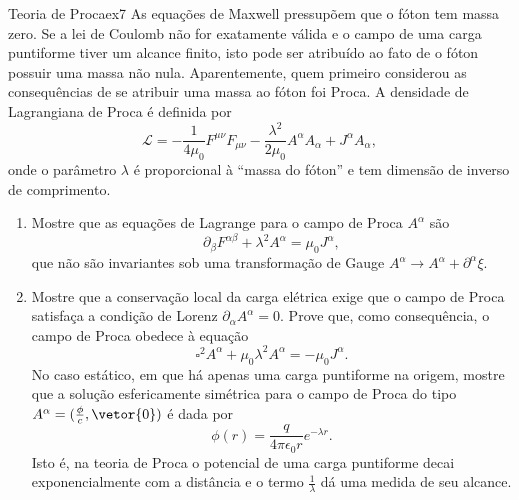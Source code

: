 \begin{exercício}{Teoria de Proca}{ex7}
   As equações de Maxwell pressupõem que o fóton tem massa zero. Se a lei de Coulomb não for exatamente válida e o campo de uma carga puntiforme tiver um alcance finito, isto pode ser atribuído ao fato de o fóton possuir uma massa não nula. Aparentemente, quem primeiro considerou as consequências de se atribuir uma massa ao fóton foi Proca. A densidade de Lagrangiana de Proca é definida por
   \begin{equation*}
      \mathcal{L} = - \frac{1}{4\mu_0} F^{\mu\nu} F_{\mu\nu} - \frac{\lambda^2}{2\mu_0} A^\alpha A_\alpha + J^\alpha A_\alpha,
   \end{equation*}
   onde o parâmetro \(\lambda\) é proporcional à \enquote{massa do fóton} e tem dimensão de inverso de comprimento.
   \begin{enumerate}[label=(\alph*)]
       \item Mostre que as equações de Lagrange para o campo de Proca \(A^\alpha\) são
          \begin{equation*}
             \partial_\beta F^{\alpha \beta} + \lambda^2 A^\alpha = \mu_0 J^\alpha,
          \end{equation*}
          que não são invariantes sob uma transformação de Gauge \(A^\alpha \to A^\alpha + \partial^\alpha \xi.\)
       \item Mostre que a conservação local da carga elétrica exige que o campo de Proca satisfaça a condição de Lorenz \(\partial_\alpha A^\alpha = 0.\) Prove que, como consequência, o campo de Proca obedece à equação 
          \begin{equation*}
              \square^2 A^\alpha + \mu_0 \lambda^2 A^\alpha = - \mu_0 J^\alpha.
          \end{equation*}
          No caso estático, em que há apenas uma carga puntiforme na origem, mostre que a solução esfericamente simétrica para o campo de Proca do tipo \(A^\alpha = (\frac{\phi}{c}, \vetor{0})\) é dada por
          \begin{equation*}
             \phi(r) = \frac{q}{4\pi \epsilon_0 r} e^{-\lambda r}.
          \end{equation*}
          Isto é, na teoria de Proca o potencial de uma carga puntiforme decai exponencialmente com a distância e o termo \(\frac{1}{\lambda}\) dá uma medida de seu alcance.
   \end{enumerate}
\end{exercício}
